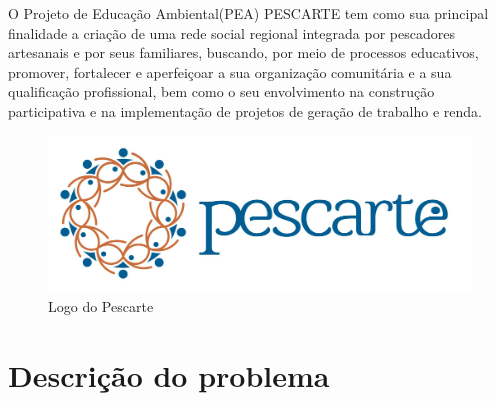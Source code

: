 \documentclass[11pt]{../../classes/ifscarticle}
\begin{document}
O Projeto de Educação Ambiental(PEA) PESCARTE tem como sua principal
finalidade a criação de uma rede social regional integrada por
pescadores artesanais e por seus familiares, buscando, por meio de
processos educativos, promover, fortalecer e aperfeiçoar a sua organização
comunitária e a sua qualificação profissional, bem como o seu envolvimento na
construção participativa e na implementação de projetos de geração de trabalho e renda.
\begin{figure}[ht]
    \centering
    \includegraphics[width=.5\linewidth]{figuras/logoPescarte}
    \caption{Logo do Pescarte}
\end{figure}

\section{Descrição do problema}
\end{document}
